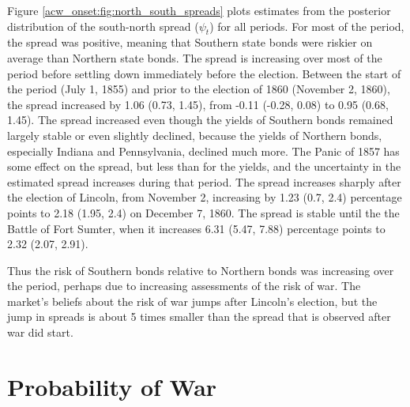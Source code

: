 Figure \ref{acw_onset:fig:north_south_spreads} plots estimates from the posterior distribution of the south-north spread ($\psi_{t}$) for all periods.
For most of the period, the spread was positive, meaning that Southern state bonds were riskier on average than Northern state bonds.
The spread is increasing over most of the period before settling down immediately before the election.
Between the start of the period (July 1, 1855) and prior to the election of 1860 (November 2, 1860), the spread increased by 1.06 (0.73, 1.45),
from -0.11 (-0.28, 0.08) to 0.95 (0.68, 1.45).
The spread increased even though the yields of Southern bonds remained largely stable or even slightly declined, because the yields of Northern bonds, especially Indiana and Pennsylvania, declined much more.
The Panic of 1857 has some effect on the spread, but less than for the yields, and the uncertainty in the estimated spread increases during that period.
The spread increases sharply after the election of Lincoln, from November 2, increasing by 1.23 (0.7, 2.4) percentage points to 2.18 (1.95, 2.4) on December 7, 1860.
The spread is stable until the the Battle of Fort Sumter, when it increases 6.31 (5.47, 7.88) percentage points to 2.32 (2.07, 2.91).

Thus the risk of Southern bonds relative to Northern bonds was increasing over the period, perhaps due to increasing assessments of the risk of war.
The market's beliefs about the risk of war jumps after Lincoln's election, but the jump in spreads is about 5 times smaller than the spread that is observed after war did start.

\section{Probability of War}
\label{acw_onset:sec:probability-war}


